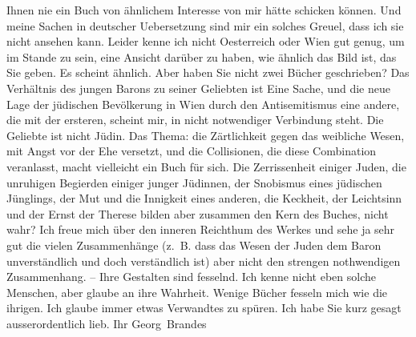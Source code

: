 \begin{ledgroupsized}[t]{13cm}
                    Ihnen nie ein Buch von ähnlichem Interesse von mir hätte schicken können. Und
                    meine Sachen in deutscher Uebersetzung sind mir ein solches Greuel, dass ich sie
                    nicht ansehen kann.\pend
           \pstart
           Leider kenne ich nicht Oesterreich oder Wien gut genug, um im Stande zu sein, eine
                    Ansicht darüber zu haben, wie ähnlich das Bild ist, das Sie geben. Es scheint
                    ähnlich. Aber haben Sie nicht zwei Bücher geschrieben? Das Verhältnis des jungen
                        Barons zu seiner
                    Geliebten ist Eine Sache, und die {\pb}neue Lage der jüdischen
                    Bevölkerung in Wien durch den Antisemitismus
                    eine andere, die mit der ersteren, scheint mir, in nicht notwendiger Verbindung
                    steht. Die Geliebte ist nicht Jüdin.\pend
           \pstart
           Das Thema: die Zärtlichkeit gegen das weibliche Wesen, mit Angst vor der Ehe
                    versetzt, und die Collisionen, die diese Combination veranlasst,  macht vielleicht ein Buch für sich. Die
                    Zerrissenheit einiger Juden, die unruhigen Begierden einiger junger Jüdinnen,
                    der Snobismus eines jüdischen Jünglings, der {\pb}Mut und die Innigkeit eines
                    anderen, die Keckheit, der Leichtsinn und der Ernst der Therese bilden aber zusammen den Kern
                    des Buches, nicht wahr? Ich freue mich über den inneren Reichthum des Werkes und
                    sehe ja sehr gut die vielen Zusammenhänge (z. B. dass das Wesen der Juden dem
                    Baron unverständlich und doch verständlich ist) aber nicht den strengen
                    nothwendigen Zusammenhang. – Ihre Gestalten sind fesselnd. Ich kenne nicht eben
                    solche Menschen, aber glaube an ihre Wahrheit.\pend
           \pstart
           Wenige Bücher fesseln mich wie die ihrigen. Ich glaube immer etwas Verwandtes zu
                    spüren.\pend
           \pstart
           Ich habe Sie kurz gesagt ausserordentlich lieb.\pend
           \pstart Ihr \spacefill\mbox{Georg Brandes}\pend{}          \endnumbering{}\end{ledgroupsized}  \newcommand{\dateiname}{L01777}\newcommand{\titel}{Georg Brandes an Arthur Schnitzler, [25. 6. 1908]}\newcommand{\editorInnen}{Martin Anton Müller und Gerd-Hermann Susen}
      